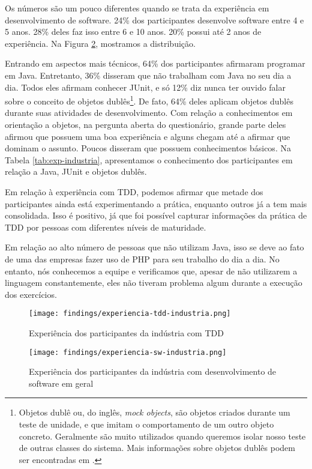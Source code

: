 Os números são um pouco diferentes quando se trata da experiência em desenvolvimento
de software. 24\% dos participantes desenvolve software entre 4 e 5 anos.
28\% deles faz isso entre 6 e 10 anos. 20\% possui até 2 anos de experiência.
Na Figura \ref{fig:exp-sw-industria}, mostramos a distribuição.

Entrando em aspectos mais técnicos, 64\% dos participantes afirmaram programar em Java. Entretanto,
36\% disseram que não trabalham com Java no seu dia a dia. Todos eles afirmam conhecer JUnit,
e só 12\% diz nunca ter ouvido falar sobre o conceito de objetos dublês\footnote{Objetos dublê ou, do inglês, 
\textit{mock objects}, são objetos criados durante um teste de unidade, e que imitam o comportamento de um
outro objeto concreto. Geralmente são muito utilizados quando queremos isolar nosso teste de outras classes
do sistema. Mais informações sobre objetos dublês podem ser encontradas em \cite{mocks}.}. De fato, 64\% deles
aplicam objetos dublês durante suas atividades de desenvolvimento. Com relação a conhecimentos
em orientação a objetos, na pergunta aberta do questionário, grande parte deles 
afirmou que possuem uma boa experiência e alguns
chegam até a afirmar que dominam o assunto. Poucos disseram que possuem conhecimentos
básicos. Na Tabela \ref{tab:exp-industria},
apresentamos o conhecimento dos participantes em relação a Java, JUnit e objetos dublês.

Em relação à experiência com TDD,
podemos afirmar que metade dos participantes ainda está experimentando a prática, enquanto
outros já a tem mais consolidada. Isso é positivo, já que foi possível capturar informações
da prática de TDD por pessoas com diferentes níveis de maturidade.

Em relação ao alto número de pessoas que não utilizam Java, isso se deve ao fato de uma das
empresas fazer uso de PHP para seu trabalho do dia a dia. No entanto, nós conhecemos a equipe
e verificamos que, apesar de não utilizarem a linguagem constantemente, eles não tiveram
problema algum durante a execução dos exercícios.

\begin{figure}[h!]
  \centering
  \texttt{[image: findings/experiencia-tdd-industria.png]}
  \caption{Experiência dos participantes da indústria com TDD}
  \label{fig:exp-tdd-industria}
\end{figure}

\begin{figure}[h!]
  \centering
  \texttt{[image: findings/experiencia-sw-industria.png]}
  \caption{Experiência dos participantes da indústria com desenvolvimento de software em geral}
  \label{fig:exp-sw-industria}
\end{figure}

